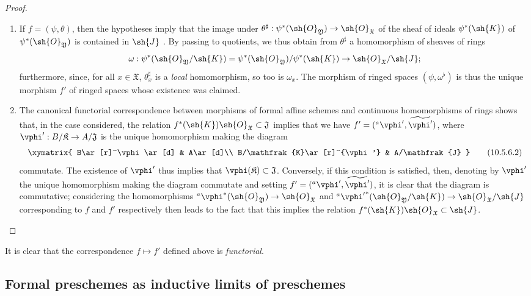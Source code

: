 \begin{proof}
\medskip\noindent
\begin{enumerate}
  \item[\rm{(i)}] If $f=(\psi,\theta)$, then the hypotheses imply that the image under $\theta^\sharp:\psi^*(\sh{O}_\mathfrak{Y})\to\sh{O}_\mathfrak{X}$ of the sheaf of ideals $\psi^*(\sh{K})$ of $\psi^*(\sh{O}_\mathfrak{Y})$ is contained in $\sh{J}$ .
    By passing to quotients, we thus obtain from $\theta^\sharp$ a homomorphism of sheaves of rings
    \[
      \omega:\psi^*(\sh{O}_\mathfrak{Y}/\sh{K})=\psi^*(\sh{O}_\mathfrak{Y})/\psi^*(\sh{K})\to\sh{O}_\mathfrak{X}/\sh{J};
    \]
    furthermore, since, for all $x\in\mathfrak{X}$, $\theta_x^\sharp$ is a \emph{local} homomorphism, so too is $\omega_x$.
    The morphism of ringed spaces $(\psi,\omega^\flat)$ is thus  the unique morphism $f'$ of ringed spaces whose existence was claimed.
  \item[\rm{(ii)}] The canonical functorial correspondence between morphisms of formal affine schemes and continuous homomorphisms of rings  shows that, in the case considered, the relation $f^*(\sh{K})\sh{O}_\mathfrak{X}\subset\mathfrak{J}$ implies that we have $f'=({}^a\vphi',\widetilde{\vphi'})$, where $\vphi':B/\mathfrak{K}\to A/\mathfrak{J}$ is the unique homomorphism making the diagram
    \[
    \label{I.10.5.6.2}
      \xymatrix{
        B\ar[r]^\vphi\ar[d] &
        A\ar[d]\\
        B/\mathfrak{K}\ar[r]^{\vphi'} &
        A/\mathfrak{J}
      }
      \tag{10.5.6.2}
    \]
    commutate.
    The existence of $\vphi'$ thus implies that $\vphi(\mathfrak{K})\subset\mathfrak{J}$.
    Conversely, if this condition is satisfied, then, denoting by $\vphi'$ the unique homomorphism making the diagram  commutate and setting $f'=({}^a\vphi',\widetilde{\vphi'})$, it is clear that the diagram  is commutative; considering the homomorphisms ${}^a\vphi^*(\sh{O}_\mathfrak{Y})\to\sh{O}_\mathfrak{X}$ and ${}^a{\vphi'}^*(\sh{O}_\mathfrak{Y}/\sh{K})\to\sh{O}_\mathfrak{X}/\sh{J}$ corresponding to $f$ and $f'$ respectively then leads to the fact that this implies the relation $f^*(\sh{K})\sh{O}_\mathfrak{X}\subset\sh{J}$.
\end{enumerate}
\end{proof}

It is clear that the correspondence $f\mapsto f'$ defined above is \emph{functorial}.

\subsection{Formal preschemes as inductive limits of preschemes}
\label{subsection:I.10.6}

